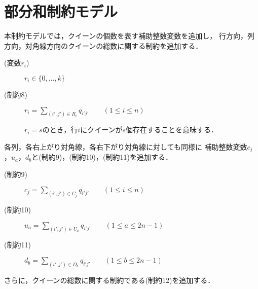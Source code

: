 \newpage
\section{部分和制約モデル}
本制約モデルでは，クイーンの個数を表す補助整数変数を追加し，
行方向，列方向，対角線方向のクイーンの総数に関する制約を追加する．
\begin{description}
 \item[(変数$r_i$)] $r_{i} \in \{0,...,k\}$ 
 \item[(制約8)] $r_{i} = \sum\limits _{(i',j') \in R_{i}} q_{i'j'} \qquad (1 \leq i \leq n)$ \par
$r_i = s$のとき，行$i$にクイーンが$s$個存在することを意味する．
\end{description}
%
各列，各右上がり対角線，各右下がり対角線に対しても同様に
補助整数変数$c_j$，$u_{a}$，$d_{b}$と(制約9)，(制約10)，(制約11)を追加する．
%
\begin{description}
 \item[(制約9)] $c_{j} = \sum\limits _{(i',j') \in C_{j}} 
q_{i'j'} \qquad (1 \leq i \leq n)$
 \item[(制約10)] $u_{a} = \sum\limits _{(i',j') \in U_{a}} 
q_{i'j'}\qquad (1 \leq a \leq 2n-1)$
 \item[(制約11)] $d_{b} = \sum\limits _{(i',j') \in D_{b}} 
q_{i'j'} \qquad(1 \leq b \leq 2n-1)$
\end{description}
さらに，クイーンの総数に関する制約である(制約12)を追加する．
